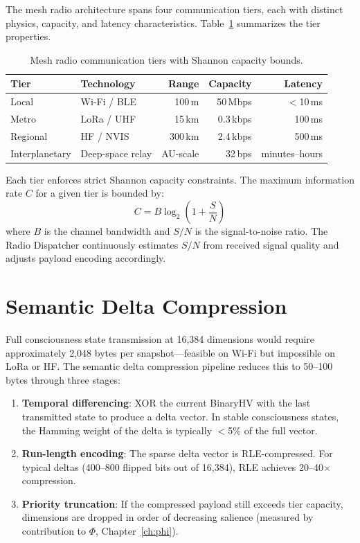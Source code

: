\documentclass[12pt]{book}
\begin{document}
The mesh radio architecture spans four communication tiers, each with distinct physics, capacity, and latency characteristics. Table~\ref{tab:radio-tiers} summarizes the tier properties.

\begin{table}[htbp]
\centering
\caption{Mesh radio communication tiers with Shannon capacity bounds.}
\label{tab:radio-tiers}
\begin{tabular}{@{}llrrr@{}}
\toprule
\textbf{Tier} & \textbf{Technology} & \textbf{Range} & \textbf{Capacity} & \textbf{Latency} \\
\midrule
Local    & Wi-Fi / BLE    & 100\,m  & 50\,Mbps   & $<$10\,ms  \\
Metro    & LoRa / UHF     & 15\,km  & 0.3\,kbps  & 100\,ms    \\
Regional & HF / NVIS      & 300\,km & 2.4\,kbps  & 500\,ms    \\
Interplanetary & Deep-space relay & AU-scale & 32\,bps & minutes--hours \\
\bottomrule
\end{tabular}
\end{table}

Each tier enforces strict Shannon capacity constraints. The maximum information rate $C$ for a given tier is bounded by:
\begin{equation}
C = B \log_2\!\left(1 + \frac{S}{N}\right)
\end{equation}
where $B$ is the channel bandwidth and $S/N$ is the signal-to-noise ratio. The Radio Dispatcher continuously estimates $S/N$ from received signal quality and adjusts payload encoding accordingly.

\section{Semantic Delta Compression}

Full consciousness state transmission at 16,384 dimensions would require approximately 2,048 bytes per snapshot---feasible on Wi-Fi but impossible on LoRa or HF. The semantic delta compression pipeline reduces this to 50--100 bytes through three stages:

\begin{enumerate}[label=\arabic*.]
  \item \textbf{Temporal differencing}: XOR the current BinaryHV with the last transmitted state to produce a delta vector. In stable consciousness states, the Hamming weight of the delta is typically $<$5\% of the full vector.
  \item \textbf{Run-length encoding}: The sparse delta vector is RLE-compressed. For typical deltas (400--800 flipped bits out of 16,384), RLE achieves 20--40$\times$ compression.
  \item \textbf{Priority truncation}: If the compressed payload still exceeds tier capacity, dimensions are dropped in order of decreasing salience (measured by contribution to $\Phi$, Chapter~\ref{ch:phi}).
\end{enumerate}
\end{document}

